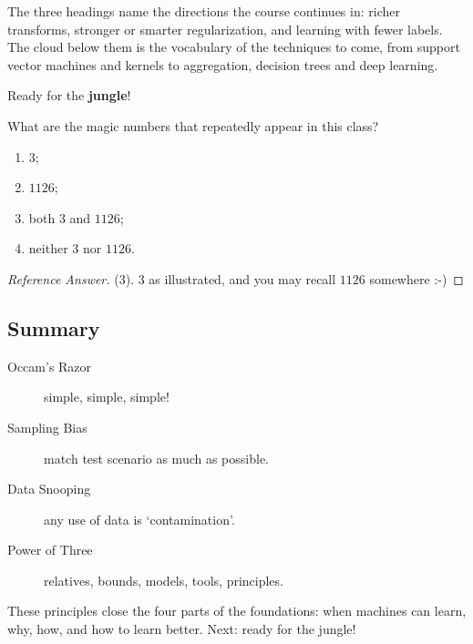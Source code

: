 The three headings name the directions the course continues in: richer
transforms, stronger or smarter regularization, and learning with fewer
labels. The cloud below them is the vocabulary of the techniques to come,
from support vector machines and kernels to aggregation, decision trees and
deep learning.

\begin{moral}
    Ready for the \textbf{jungle}!
\end{moral}

\begin{exercise}
    What are the magic numbers that repeatedly appear in this class?
    \begin{enumerate}[(1)]
        \item \(3\);
        \item \(1126\);
        \item both \(3\) and \(1126\);
        \item neither \(3\) nor \(1126\).
    \end{enumerate}
\end{exercise}

\begin{proof}[Reference Answer]
    (3). \(3\) as illustrated, and you may recall \(1126\) somewhere :-)
\end{proof}

\hrulebar

\subsection*{Summary}

\begin{description}
    \item[Occam's Razor] simple, simple, simple!
    \item[Sampling Bias] match test scenario as much as possible.
    \item[Data Snooping] any use of data is `contamination'.
    \item[Power of Three] relatives, bounds, models, tools, principles.
\end{description}

These principles close the four parts of the foundations: when machines can
learn, why, how, and how to learn better. Next: ready for the jungle!
